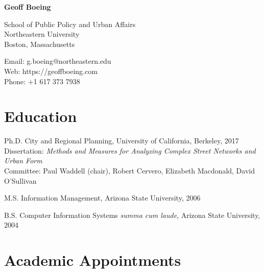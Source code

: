 \documentclass[12pt,letterpaper]{report}
\newcommand{\myname}{Geoff Boeing}
\newcommand{\namefont}[1]{{\normalfont\bfseries\Huge{#1}}}
\begin{document}
\raggedright

\namefont{\myname}

\vspace{1em}
\begin{minipage}[t]{0.495\textwidth}
  School of Public Policy and Urban Affairs \\
  Northeastern University \\
  Boston, Massachusetts
\end{minipage}
\begin{minipage}[t]{0.495\textwidth}
  Email: g.boeing@northeastern.edu \\
  Web: https://geoffboeing.com \\
  Phone: +1 617 373 7938
\end{minipage}
\vspace{0.5em}



\section*{Education}

\begin{tablist}
	
\item[Ph.D.] \tab City and Regional Planning, University of California, Berkeley, 2017 \\
                  Dissertation: \textit{Methods and Measures for Analyzing Complex Street Networks and Urban Form} \\
                  Committee: Paul Waddell (chair), Robert Cervero, Elizabeth Macdonald, David O'Sullivan
                  
\item[M.S.]  \tab Information Management, Arizona State University, 2006

\item[B.S.]  \tab Computer Information Systems \textit{summa cum laude}, Arizona State University, 2004

\end{tablist}



\section*{Academic Appointments}
\end{document}
